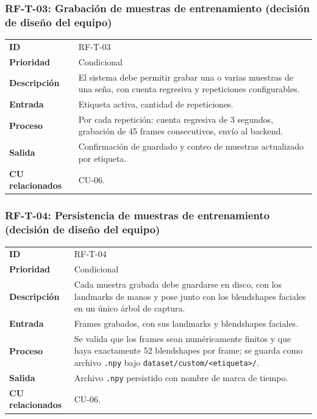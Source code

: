 \subsubsection{RF-T-03: Grabación de muestras de entrenamiento (decisión de diseño del equipo)}
\begin{table}[H]
\centering
\begin{tabularx}{\textwidth}{l X}
\toprule
\textbf{ID} & RF-T-03 \\
\textbf{Prioridad} & Condicional \\
\textbf{Descripción} & El sistema debe permitir grabar una o varias muestras de una seña, con cuenta regresiva y repeticiones configurables. \\
\textbf{Entrada} & Etiqueta activa, cantidad de repeticiones. \\
\textbf{Proceso} & Por cada repetición: cuenta regresiva de 3 segundos, grabación de 45 frames consecutivos, envío al backend. \\
\textbf{Salida} & Confirmación de guardado y conteo de muestras actualizado por etiqueta. \\
\textbf{CU relacionados} & CU-06. \\
\bottomrule
\end{tabularx}
\end{table}

\subsubsection{RF-T-04: Persistencia de muestras de entrenamiento (decisión de diseño del equipo)}
\begin{table}[H]
\centering
\begin{tabularx}{\textwidth}{l X}
\toprule
\textbf{ID} & RF-T-04 \\
\textbf{Prioridad} & Condicional \\
\textbf{Descripción} & Cada muestra grabada debe guardarse en disco, con los landmarks de manos y pose junto con los blendshapes faciales en un único árbol de captura. \\
\textbf{Entrada} & Frames grabados, con sus landmarks y blendshapes faciales. \\
\textbf{Proceso} & Se valida que los frames sean numéricamente finitos y que haya exactamente 52 blendshapes por frame; se guarda como archivo \texttt{.npy} bajo \texttt{dataset/custom/<etiqueta>/}. \\
\textbf{Salida} & Archivo \texttt{.npy} persistido con nombre de marca de tiempo. \\
\textbf{CU relacionados} & CU-06. \\
\bottomrule
\end{tabularx}
\end{table}

